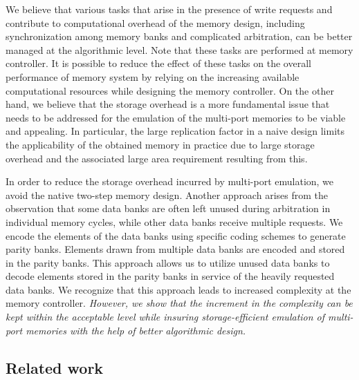 {\color{red}We believe that various tasks that arise in the presence of write requests and contribute to computational overhead of the memory design, including synchronization among memory banks and complicated arbitration, can be better managed at the algorithmic level. Note that these tasks are performed at memory controller. It is possible to reduce the effect of these tasks on the overall performance of memory system by relying on the increasing available computational resources while designing the memory controller. On the other hand, we believe that the storage overhead is a more fundamental issue that needs to be addressed for the emulation of the multi-port memories to be viable and appealing. In particular, the large replication factor in a naive design limits the applicability of the obtained memory in practice due to large storage overhead and the associated large area requirement resulting from this.}

In order to reduce the storage overhead incurred by multi-port emulation, we avoid the native two-step memory design. Another approach arises from the observation that some data banks are often left unused during arbitration in individual memory cycles, while other data banks receive multiple requests. We encode the elements of the data banks using specific coding schemes to generate parity banks. Elements drawn from multiple data banks are encoded and stored in the parity banks. This approach allows us to utilize unused data banks to decode elements stored in the parity banks in service of the heavily requested data banks. We recognize that this approach leads to increased complexity at the memory controller. {\color{red} {\em However, we show that the increment in the complexity can be kept within the acceptable level while insuring storage-efficient emulation of multi-port memories with the help of better algorithmic design.}}

\subsection{Related work}

